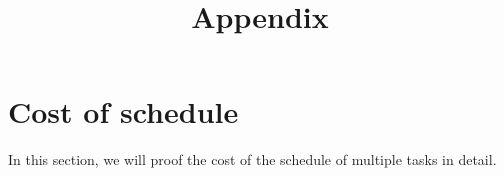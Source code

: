 \documentclass[sigconf,anonymous]{aamas}
\title[AAMAS-2025 Formatting Instructions]
{Appendix}
\begin{document}

\pagestyle{fancy}
\fancyhead{}


\maketitle 


\section{Cost of schedule}
In this section,
we will proof the cost of the schedule of multiple tasks in detail.
\label{sec:cost}
\end{document}
